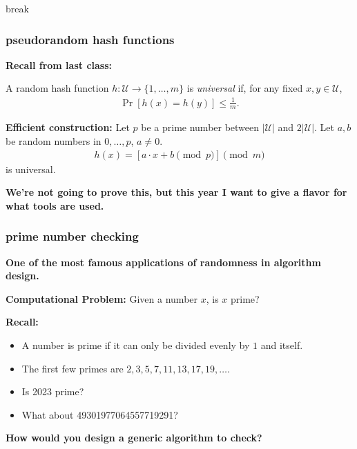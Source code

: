 \documentclass[compress]{beamer}
\begin{document}
\begin{frame}[standout]
	\begin{center}
		break
	\end{center}
\end{frame}

	\begin{frame}
	\frametitle{pseudorandom hash functions}
	\textbf{Recall from last class:}
	\begin{definition}
		 A random hash function $h: \mathcal{U} \rightarrow \{1, \ldots, m\}$ is \emph{universal} if, for any fixed $x,y\in \mathcal{U}$,\vspace{-1.5em}
		\begin{align*}
			\Pr[h(x) = h(y)] \leq \frac{1}{m}.
		\end{align*}
	\end{definition}
	\textbf{Efficient construction:} Let $p$ be a prime number between $|\mathcal{U}|$ and $2|\mathcal{U}|$. Let $a,b$ be random numbers in $0,\ldots, p$, $a\neq 0$.
	\begin{align*}
		h(x) = \left[a\cdot x + b \pmod{p}\right] \pmod{m}
	\end{align*} 
	is universal. 
	
	\begin{center}
\textbf{We're not going to prove this, but this year I want to give a flavor for what tools are used.}
	\end{center}
\end{frame}


\begin{frame}
	\frametitle{prime number checking}
	\begin{center}
		\textbf{\alert{One of the most famous applications of randomness in algorithm design.}}
	\end{center}
	\textbf{Computational Problem:} Given a number $x$, is $x$ prime? 
	
	\textbf{Recall:} 
	\begin{itemize}
		\item A number is prime if it can only be divided evenly by $1$ and itself. 
		\item The first few primes are $2,3,5,7,11,13, 17, 19,\ldots$.
		\item Is 2023 prime?
		\item What about 49301977064557719291?
	\end{itemize}
	\textbf{How would you design a generic algorithm to check?}
\end{frame}
\end{document}
